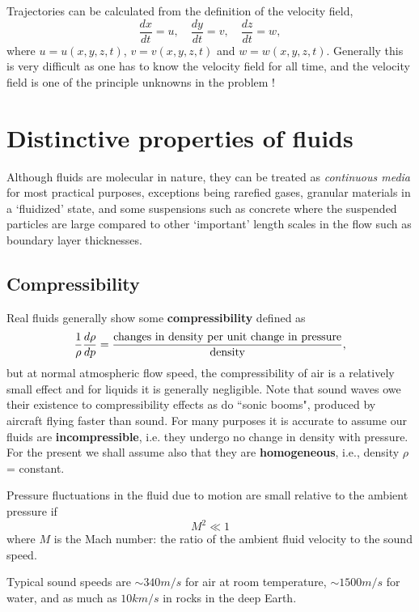\documentclass[10pt]{report}
\begin{document}
Trajectories can be calculated from the definition of the velocity field,
\[
\frac{dx}{dt}=u,
\quad
\frac{dy}{dt}=v,
\quad
\frac{dz}{dt}=w,
\]
where $u=u(x,y,z,t)$, $v=v(x,y,z,t)$ and $w=w(x,y,z,t)$.
Generally this is very difficult as one has to know the velocity field for all time,
and the velocity field is one of the principle unknowns in the problem !


%
%

\section{Distinctive properties of fluids}

Although fluids are molecular in nature, they can be treated as  \textit{continuous media} for most
practical purposes, exceptions being rarefied gases, granular materials in a `fluidized' state, and some suspensions such as concrete where the suspended particles are large compared to other `important'
length scales in the flow such as boundary layer thicknesses.

\subsection{Compressibility}

Real fluids generally show some \textbf{compressibility} defined as
\[
\frac{1}{\rho }\frac{d\rho }{dp}=
	\frac{\hbox{changes in density per unit change in pressure}}{\hbox{density}},
\]
but at normal atmospheric flow speed, the compressibility of air is a
relatively small effect and for liquids it is generally negligible. Note that
sound waves owe their existence to compressibility effects as do ``sonic
booms", produced by aircraft flying faster than sound. For many purposes it
is accurate to assume our fluids are \textbf{incompressible}, i.e. they
undergo no change in density with pressure. For the present we shall assume
also that they are \textbf{homogeneous}, i.e., density $\rho $ = constant.

Pressure fluctuations in the fluid due to motion are small relative to the
ambient pressure if
\begin{equation}
	M^{2} \ll 1
\end{equation}
where $M$ is the Mach number: the ratio of the ambient fluid velocity to the
sound speed.

\begin{lecturehints}
Typical sound speeds are $\sim 340 m/s$ for air at room temperature,
$\sim 1500 m/s$ for water, and as much as $10 km/s$ in rocks in the deep Earth.
\end{lecturehints}
\end{document}

